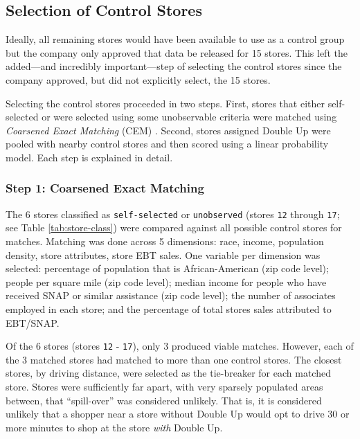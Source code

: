 \documentclass[12pt,letterpaperpaper,]{book}
\begin{document}
\subsection*{Selection of Control
Stores}\label{selection-of-control-stores}

Ideally, all remaining stores would have been available to use as a
control group but the company only approved that data be released for 15
stores. This left the added---and incredibly important---step of
selecting the control stores since the company approved, but did not
explicitly select, the 15 stores.

Selecting the control stores proceeded in two steps. First, stores that
either self-selected or were selected using some unobservable criteria
were matched using \emph{Coarsened Exact Matching} (CEM)
\citep{iacus_causal_2011}. Second, stores assigned Double Up were pooled
with nearby control stores and then scored using a linear probability
model. Each step is explained in detail.

\subsubsection{Step 1: Coarsened Exact
Matching}\label{step-1-coarsened-exact-matching}

The 6 stores classified as \texttt{self-selected} or \texttt{unobserved}
(stores \texttt{12} through \texttt{17}; see Table
\ref{tab:store-class}) were compared against all possible control stores
for matches. Matching was done across 5 dimensions: race, income,
population density, store attributes, store EBT sales. One variable per
dimension was selected: percentage of population that is
African-American (zip code level); people per square mile (zip code
level); median income for people who have received SNAP or similar
assistance (zip code level); the number of associates employed in each
store; and the percentage of total stores sales attributed to EBT/SNAP.

Of the 6 stores (stores \texttt{12} - \texttt{17}), only 3 produced
viable matches. However, each of the 3 matched stores had matched to
more than one control stores. The closest stores, by driving distance,
were selected as the tie-breaker for each matched store. Stores were
sufficiently far apart, with very sparsely populated areas between, that
``spill-over'' was considered unlikely. That is, it is considered
unlikely that a shopper near a store without Double Up would opt to
drive 30 or more minutes to shop at the store \emph{with} Double Up.
\end{document}
